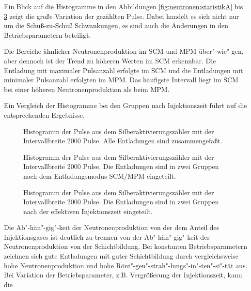%
\par
Ein Blick auf die Histogramme in den Abbildungen
\vref{fig:neutronen:statistikA} bis \ref{fig:neutronen:statistikC}
zeigt die große Variation der gezählten Pulse. Dabei handelt es
sich nicht nur um die Schuß-zu-Schuß Schwankungen, es sind auch
die Änderungen in den Betriebsparametern beteiligt.
\par
Die Bereiche ähnlicher Neutronenproduktion im SCM und MPM
über"-wie"-gen, aber dennoch ist der Trend zu höheren Werten im
SCM erkennbar. Die Entladung mit maximaler Pulsanzahl erfolgte im
SCM und die Entladungen mit minimaler Pulsanzahl erfolgten im MPM.
Das häufigste Intervall liegt im SCM bei einer höheren
Neutronenproduktion als beim MPM.
\par
Ein Vergleich der Histogramme bei den Gruppen nach Injektionszeit
führt auf die entsprechenden Ergebnisse.
%
\par
\begin{figure}[H]
  \center
  \caption{Histogramm der Pulse aus dem Silberaktivierungszähler mit der Intervallbreite 2000 Pulse.
     Alle Entladungen sind zusammengefaßt.}
  \label{fig:neutronen:statistikA}
\end{figure}
%
\par
\begin{figure}[H]
  \center
  \caption{Histogramm der Pulse aus dem Silberaktivierungszähler mit der Intervallbreite 2000 Pulse.
     Die Entladungen sind in zwei Gruppen nach dem Entladungsmodus SCM/MPM eingeteilt.}
  \label{fig:neutronen:statistikB}
\end{figure}
%
\par
\begin{figure}[H]
  \center
  \caption{Histogramm der Pulse aus dem Silberaktivierungszähler mit der Intervallbreite 2000 Pulse.
     Die Entladungen sind in zwei Gruppen nach der effektiven Injektionszeit \teff eingeteilt.}
  \label{fig:neutronen:statistikC}
\end{figure}
%
\par
Die Ab"-hän"-gig"-keit der Neutronenproduktion von der dem Anteil
des Injektionsgases ist deutlich zu trennen von der
Ab"-hän"-gig"-keit der Neutronenproduktion von der Schichtbildung.
Bei konstanten Betriebsparametern zeichnen sich gute Entladungen
mit guter Schichtbildung durch vergleichsweise hohe
Neutronenproduktion und hohe
Rönt"-gen"-strah"-lungs"-in"-ten"-si"-tät aus. Bei Variation der
Betriebsparameter, z.B. Vergrößerung der Injektionszeit, kann die
